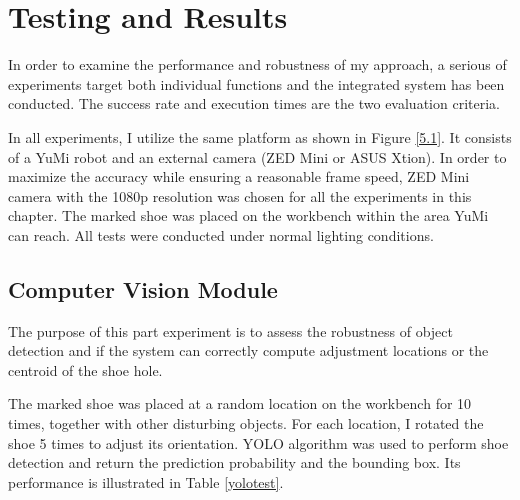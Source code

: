 \chapter{Testing and Results}

In order to examine the performance and robustness of my approach, a serious of experiments target both individual functions and the integrated system has been conducted. The success rate and execution times are the two evaluation criteria.

In all experiments, I utilize the same platform as shown in Figure \ref{5.1}. It consists of a YuMi robot and an external camera (ZED Mini or ASUS Xtion). In order to maximize the accuracy while ensuring a reasonable frame speed, ZED Mini camera with the 1080p resolution was chosen for all the experiments in this chapter. The marked shoe was placed on the workbench within the area YuMi can reach. All tests were conducted under normal lighting conditions. 

\section{Computer Vision Module}
The purpose of this part experiment is to assess the robustness of object detection and if the system can correctly compute adjustment locations or the centroid of the shoe hole.

The marked shoe was placed at a random location on the workbench for 10 times, together with other disturbing objects. For each location, I rotated the shoe 5 times to adjust its orientation. YOLO algorithm was used to perform shoe detection and return the prediction probability and the bounding box. Its performance is illustrated in Table \ref{yolotest}.

